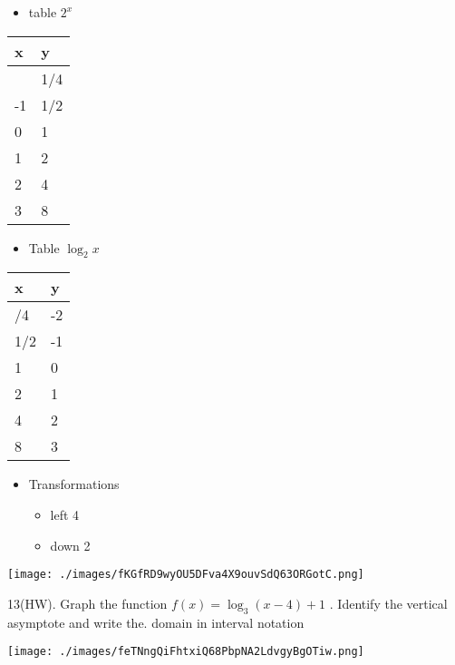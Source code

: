 \documentclass{book}
\begin{document}
\begin{itemize}
	\tightlist
	\item
	      table \(2^x\)
\end{itemize}

\begin{longtable}[]{@{}ll@{}}
	\toprule\noalign{}
	x  & y   \\
	\midrule\noalign{}
	\endhead
	\bottomrule\noalign{}
	\endlastfoot
	-2 & 1/4 \\
	-1 & 1/2 \\
	0  & 1   \\
	1  & 2   \\
	2  & 4   \\
	3  & 8   \\
\end{longtable}

\begin{itemize}
	\tightlist
	\item
	      Table \(\log_2x\)
\end{itemize}

\begin{longtable}[]{@{}ll@{}}
	\toprule\noalign{}
	x   & y  \\
	\midrule\noalign{}
	\endhead
	\bottomrule\noalign{}
	\endlastfoot
	1/4 & -2 \\
	1/2 & -1 \\
	1   & 0  \\
	2   & 1  \\
	4   & 2  \\
	8   & 3  \\
\end{longtable}

\begin{itemize}
	\tightlist
	\item
	      Transformations

	      \begin{itemize}
		      \tightlist
		      \item
		            left 4
		      \item
		            down 2
	      \end{itemize}
\end{itemize}

\texttt{[image: ./images/fKGfRD9wyOU5DFva4X9ouvSdQ63ORGotC.png]}

13(HW). Graph the function \(f(x)=\log_{3}(x-4)+1\) . Identify the
vertical asymptote and write the. domain in interval notation

\texttt{[image: ./images/feTNngQiFhtxiQ68PbpNA2LdvgyBgOTiw.png]}
\end{document}
